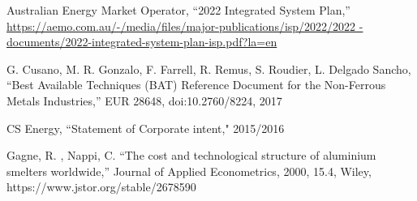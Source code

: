 \documentclass[12pt,a4paper]{article}
\begin{document}
\begin{thebibliography}{1}
 Australian Energy Market Operator, “2022 Integrated System
  Plan,”
    \url{https://aemo.com.au/-/media/files/major-publications/isp/2022/2022
    -documents/2022-integrated-system-plan-isp.pdf?la=en}

 G. Cusano, M. R. Gonzalo, F. Farrell, R. Remus, S. Roudier, L.
  Delgado Sancho,   “Best Available Techniques (BAT) Reference Document for the
    Non-Ferrous Metals Industries,” EUR 28648, doi:10.2760/8224, 2017

  CS Energy, ``Statement of Corporate intent," 2015/2016

  Gagne, R. , Nappi, C.  ``The cost and technological structure of aluminium
    smelters worldwide,'' Journal of Applied Econometrics, 2000, 15.4, Wiley,
    https://www.jstor.org/stable/2678590


  

\end{thebibliography}
\end{document}

